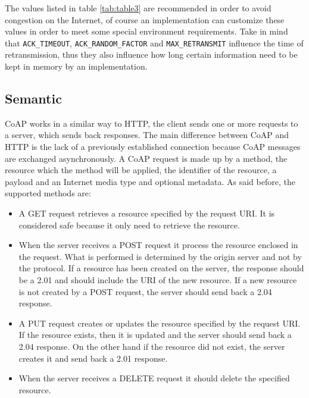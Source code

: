 	

	The values listed in table \ref{tab:table3} are recommended in order to avoid congestion on the Internet, of course an implementation can customize these values in order to meet some special environment requirements.\newline
	Take in mind that \texttt{ACK\_TIMEOUT}, \texttt{ACK\_RANDOM\_FACTOR} and \texttt{MAX\_RETRANSMIT} influence the time of retransmission, thus they also influence how long certain information need  to be kept in memory by an implementation.\newline
	
	\subsection{Semantic}
	
	CoAP works in a similar way to HTTP, the client sends one or more requests to a server, which sends back responses.\newline
	The main difference between CoAP and HTTP is the lack of a previously established connection because CoAP messages are exchanged asynchronously.\newline
	A CoAP request is made up by a method, the resource which the method will be applied, the identifier of the resource,
	a payload and an Internet media type and optional metadata.\newline
	As said before, the supported methods are:\newline
	\begin{itemize}
		\item A GET request retrieves a resource specified by the request URI.
		It is considered safe because it only need to retrieve the resource.
	
		\item When the server receives a POST request it process the resource enclosed in the request.
		What is performed is determined by the origin server and not by the protocol.
		If a resource has been created on the server, the response should be a 2.01 and should include the URI of the new resource.
		If a new resource is not created by a POST request, the server should send back a 2.04 response.
		
		\item A PUT request creates or updates the resource specified by the request URI.
		If the resource exists, then it is updated and the server should send back a 2.04 response.
		On the other hand if the resource did not exist, the server creates it and send back a 2.01 response.
		
		\item When the server receives a DELETE request it should delete the specified resource.
		
	\end{itemize}

